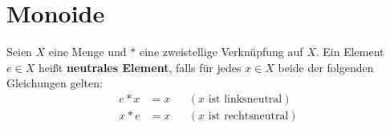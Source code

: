  
\section{Monoide}


\begin{defin} \label{def:neutrales} 
    Seien $X$ eine Menge und $*$ eine zweistellige Verknüpfung auf $X$. Ein Element $e\in X$ heißt \textbf{neutrales Element}, falls für jedes $x\in X$ beide der folgenden Gleichungen gelten:
    \begin{align*}
        e*x & = x && (\text{$x$ ist linksneutral}) \\
        x*e & = x && (\text{$x$ ist rechtsneutral})
    \end{align*}
\end{defin}


